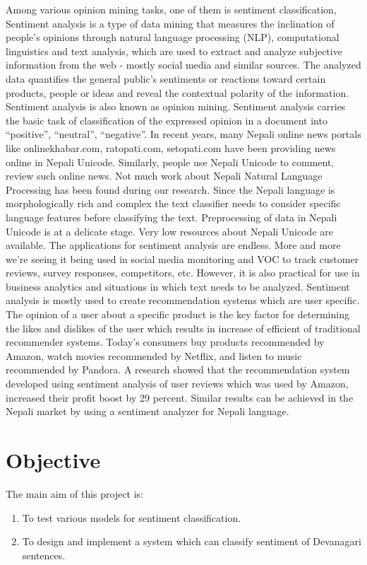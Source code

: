 Among various opinion mining tasks, one of them is sentiment classification, Sentiment
analysis is a type of data mining that measures the inclination of people’s opinions
through natural language processing (NLP), computational linguistics and text analysis,
which are used to extract and analyze subjective information from the web - mostly
social media and similar sources. The analyzed data quantifies the general public's
sentiments or reactions toward certain products, people or ideas and reveal the
contextual polarity of the information. Sentiment analysis is also known as opinion
mining. Sentiment analysis carries the basic task of classification of the expressed
opinion in a document into “positive”, “neutral”, “negative”.
In recent years, many Nepali online news portals like onlinekhabar.com, ratopati.com, 
setopati.com 
have been providing news online in Nepali Unicode. Similarly, people use
Nepali Unicode to comment, review such online news. Not much work about Nepali
Natural Language Processing has been found during our research. Since the Nepali
language is morphologically rich and complex the text classifier needs to consider
specific language features before classifying the text. Preprocessing of data in Nepali
Unicode is at a delicate stage. Very low resources about Nepali Unicode are available.
The applications for sentiment analysis are endless. More and more we’re seeing it
being used in social media monitoring and VOC to track customer reviews, survey
responses, competitors, etc. However, it is also practical for use in business analytics
and situations in which text needs to be analyzed. Sentiment analysis is mostly used to
create recommendation systems which are user specific. The opinion of a user about a
specific product is the key factor for determining the likes and dislikes of the user which
results in increase of efficient of traditional recommender systems. Today’s consumers
buy products recommended by Amazon, watch movies recommended by Netflix, and
listen to music recommended by Pandora. A research showed that the recommendation
system developed using sentiment analysis of user reviews which was used by Amazon,
increased their profit boost by 29 percent. Similar results can be achieved in the Nepali
market by using a sentiment analyzer for Nepali language.
       \section{Objective}
            The main aim of this project is:
            \begin{enumerate}
                 \item To test various models for sentiment classification.
                \item To design and implement a system which can classify sentiment of
Devanagari sentences.
            \end{enumerate}